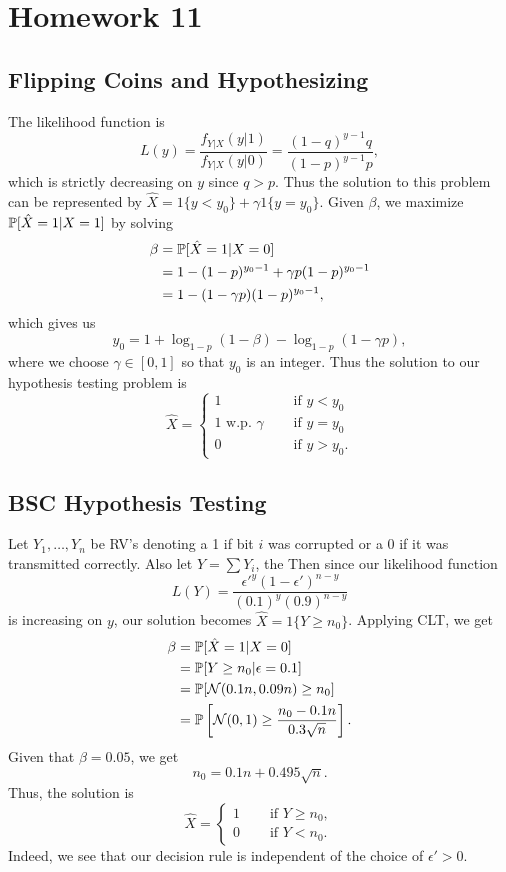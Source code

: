 \section{Homework 11}

\subsection{Flipping Coins and Hypothesizing}
The likelihood function is
\[
L(y) = \frac{f_{Y|X}(y | 1)}{f_{Y|X}(y | 0)} = \frac{(1 - q)^{y - 1}q}{(1 - p)^{y - 1}p},
\]
which is strictly decreasing on $y$ since $q > p$. Thus the solution to this problem can be represented by $\hat{X} = 1\{y < y_0\} + \gamma 1\{y = y_0\}$. Given $\beta$, we maximize $\P[\hat{X} = 1 | X = 1]$ by solving
\begin{align*}
    \beta &= \P[\hat{X} = 1 | X = 0] \\
        &= 1 - (1 - p)^{y_0 - 1} + \gamma p(1 - p)^{y_0 - 1} \\
        &= 1 - (1 - \gamma p)(1 - p)^{y_0 - 1},
\end{align*}
which gives us 
\[
y_0 = 1 + \log_{1 - p}(1 - \beta) - \log_{1 - p}(1 - \gamma p),
\]
where we choose $\gamma \in [0, 1]$ so that $y_0$ is an integer. Thus the solution to our hypothesis testing problem is
\[
\hat{X} = \begin{cases}
1 &\quad\text{ if } y < y_0 \\
1 \text{  w.p. } \gamma &\quad\text{  if } y = y_0 \\
0 &\quad\text{ if } y > y_0.
\end{cases}\]

\subsection{BSC Hypothesis Testing}
Let $Y_1, \dots, Y_n$ be RV's denoting a 1 if bit $i$ was corrupted or a 0 if it was transmitted correctly. Also let $Y = \sum Y_i$, the Then since our likelihood function
\[
L(Y) = \frac{\epsilon'^y(1 - \epsilon')^{n - y}}{(0.1)^y(0.9)^{n - y}}
\]
is increasing on $y$, our solution becomes $\hat{X} = 1\{Y \geq n_0\}$. Applying CLT, we get
\begin{align*}
    \beta &= \P[\hat{X} = 1 | X = 0] \\
        &= \P[Y \geq n_0 | \epsilon = 0.1] \\
        &= \P[\Nor(0.1n, 0.09n) \geq n_0] \\
        &= \P\left[\Nor(0, 1) \geq \frac{n_0 - 0.1n}{0.3\sqrt{n}}\right].
\end{align*}
Given that $\beta = 0.05$, we get
\[
n_0 = 0.1n + 0.495\sqrt{n}.
\]
Thus, the solution is
\[
\hat{X} = \begin{cases}
1 &\quad\text{ if } Y \geq n_0, \\
0 &\quad\text{ if } Y < n_0.
\end{cases}
\]
Indeed, we see that our decision rule is independent of the choice of $\epsilon' > 0$.


